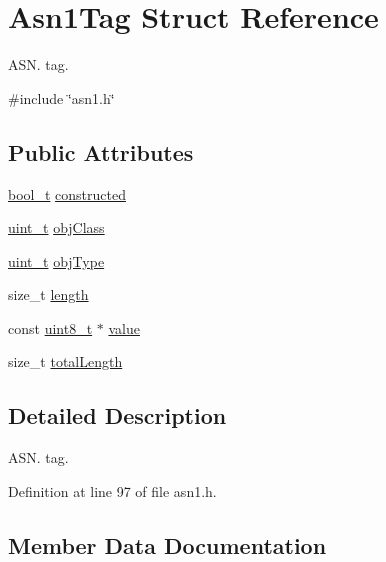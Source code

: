 \hypertarget{structAsn1Tag}{}\section{Asn1\+Tag Struct Reference}
\label{structAsn1Tag}


A\+S\+N. tag.  




{\ttfamily \#include \char`\"{}asn1.\+h\char`\"{}}

\subsection*{Public Attributes}
\begin{DoxyCompactItemize}
\item 
\hyperlink{compiler__port_8h_a812d16e5494522586b3784e55d479912}{bool\+\_\+t} \hyperlink{structAsn1Tag_a93c64e611d57dfb59e6ebafe938f28c1}{constructed}
\item 
\hyperlink{compiler__port_8h_a12a1e9b3ce141648783a82445d02b58d}{uint\+\_\+t} \hyperlink{structAsn1Tag_a9f35c291ffa22d903d9c66638bb225ea}{obj\+Class}
\item 
\hyperlink{compiler__port_8h_a12a1e9b3ce141648783a82445d02b58d}{uint\+\_\+t} \hyperlink{structAsn1Tag_a3ecdc4bbf328b5216521cb2114f45935}{obj\+Type}
\item 
size\+\_\+t \hyperlink{structAsn1Tag_a5131e751817ae2cbfdaf031c2ce97f3d}{length}
\item 
const \hyperlink{stdint_8h_aba7bc1797add20fe3efdf37ced1182c5}{uint8\+\_\+t} $\ast$ \hyperlink{structAsn1Tag_a90f3832fa59c62feb4fb8be9d8b11b29}{value}
\item 
size\+\_\+t \hyperlink{structAsn1Tag_a27df45a2d65de5a2a1289a64e43149bf}{total\+Length}
\end{DoxyCompactItemize}


\subsection{Detailed Description}
A\+S\+N. tag. 

Definition at line 97 of file asn1.\+h.



\subsection{Member Data Documentation}
\mbox{\label{structAsn1Tag_a93c64e611d57dfb59e6ebafe938f28c1}} 
